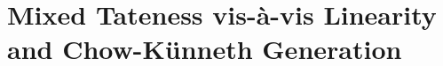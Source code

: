 \documentclass[11pt]{amsart}
\newtheorem{thm}{Theorem}[section]
\newtheorem{lem}[thm]{Lemma}
\theoremstyle{definition}
\theoremstyle{remark}
\numberwithin{equation}{section}
\begin{document}








\section{Mixed Tateness vis-\`a-vis Linearity and Chow-K\"unneth Generation}\label{section 3}
\end{document}
